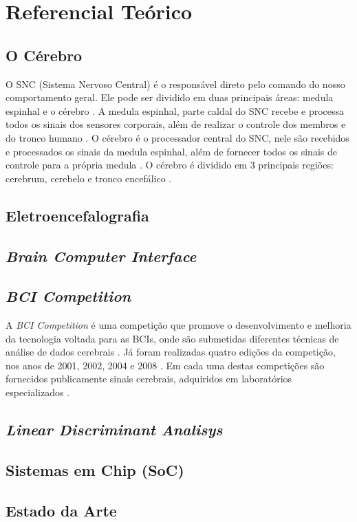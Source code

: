 
\chapter[Referencial Teórico]{Referencial Teórico}

\section{O Cérebro}
O SNC (Sistema Nervoso Central) é o responsável direto pelo comando do nosso comportamento geral\cite{David_Clarck}. Ele pode ser dividido em duas principais áreas: medula espinhal e o cérebro \cite{KANDEL}.
A medula espinhal, parte caldal do SNC recebe e processa todos os sinais dos sensores corporais, além de realizar o controle dos membros e do tronco humano \cite{KANDEL}.
O cérebro é o processador central do SNC, nele são recebidos e processados os sinais da medula espinhal, além de fornecer todos os sinais de controle para a própria medula \cite{KANDEL}. O cérebro é dividido em 3 principais regiões: cerebrum, cerebelo e tronco encefálico \cite{SIULYDissertacao}.
\section{Eletroencefalografia}

\section{\textit{Brain Computer Interface}}

\section{\textit{BCI Competition}}
A \textit{BCI Competition} é uma competição que promove o desenvolvimento e melhoria da tecnologia voltada para as BCIs, onde são submetidas diferentes técnicas de análise de dados cerebrais \cite{BCICompetition}. Já foram realizadas quatro edições da competição, nos anos de 2001, 2002, 2004 e 2008 \cite{BCICompetition}. Em cada uma destas competições são fornecidos publicamente sinais cerebrais, adquiridos em laboratórios especializados \cite{BCICompetition}.
 
\section{\textit{Linear Discriminant Analisys}}

\section{Sistemas em Chip (SoC)}

\section{Estado da Arte}



